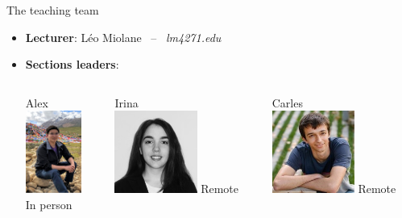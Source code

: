 \documentclass{beamer}
\begin{document}
\begin{frame}[t]{The teaching team}

	\begin{itemize}
		\item \textbf{Lecturer}: \quad Léo Miolane \  -- \ \emph{lm4271\@nyu.edu}
			\vspace{0.3cm}
			\vspace{0.3cm}
		\item \textbf{Sections leaders}:
			\vspace{0.5cm}
			\begin{columns}
				\begin{column}{0.3\textwidth}
					\begin{center}
						Alex
						\\
						\vspace*{0.2cm}
						\includegraphics[height=2.7cm]{./alex.jpeg}
						\\
						In person
					\end{center}
				\end{column}
				\begin{column}{0.3\textwidth}
					\begin{center}
						Irina
						\\
						\vspace*{0.2cm}
						\includegraphics[height=2.7cm]{./irina.jpeg}
						Remote
					\end{center}
				\end{column}
				\begin{column}{0.3\textwidth}
					\begin{center}
						Carles
						\\
						\vspace*{0.2cm}
						\includegraphics[height=2.7cm]{./carles.jpeg}
						Remote
					\end{center}
				\end{column}
			\end{columns}
	\end{itemize}

\end{frame}
\end{document}
